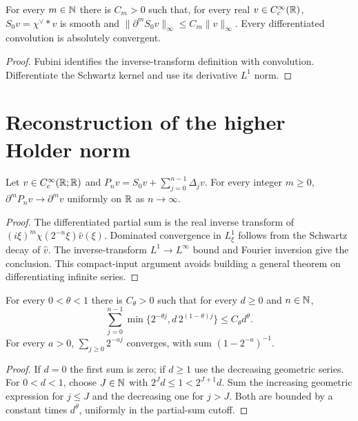 \begin{lemma}
  \label{lem:c12_low_block_bound}
  For every $m\in\mathbb{N}$ there is $C_m>0$ such that, for every real
  $v\in C_c^\infty(\mathbb{R})$, $S_0v=\chi^\vee*v$ is smooth and
  $\|\partial^mS_0v\|_\infty\le C_m\|v\|_\infty$.
  Every differentiated convolution is absolutely convergent.
\end{lemma}
\begin{proof}
  Fubini identifies the inverse-transform definition with convolution.
  Differentiate the Schwartz kernel and use its derivative $L^1$ norm.
\end{proof}

\section{Reconstruction of the higher Holder norm}

\begin{lemma}
  \label{lem:c12_reconstruction_derivatives}
  Let $v\in C_c^\infty(\mathbb{R};\mathbb{R})$ and
  $P_nv=S_0v+\sum_{j=0}^{n-1}\Delta_jv$.
  For every integer $m\ge0$, $\partial^mP_nv\to\partial^mv$ uniformly on $\mathbb{R}$ as $n\to\infty$.
\end{lemma}
\begin{proof}
  The differentiated partial sum is the real inverse transform of
  $(i\xi)^m\chi(2^{-n}\xi)\widehat v(\xi)$.
  Dominated convergence in $L^1_\xi$ follows from the Schwartz decay of $\widehat v$.
  The inverse-transform $L^1\to L^\infty$ bound and Fourier inversion give the conclusion.
  This compact-input argument avoids building a general theorem on differentiating infinite series.
\end{proof}

\begin{lemma}
  \label{lem:c12_dyadic_increment_sum}
  For every $0<\theta<1$ there is $C_\theta>0$ such that for every $d\ge0$ and $n\in\mathbb{N}$,
  \[
    \sum_{j=0}^{n-1}\min\{2^{-\theta j},d\,2^{(1-\theta)j}\}
        \le C_\theta d^\theta.
  \]
  For every $a>0$, $\sum_{j\ge0}2^{-aj}$ converges, with sum $(1-2^{-a})^{-1}$.
\end{lemma}
\begin{proof}
  If $d=0$ the first sum is zero; if $d\ge1$ use the decreasing geometric series.
  For $0<d<1$, choose $J\in\mathbb{N}$ with $2^Jd\le1<2^{J+1}d$.
  Sum the increasing geometric expression for $j\le J$ and the decreasing one for $j>J$.
  Both are bounded by a constant times $d^\theta$, uniformly in the partial-sum cutoff.
\end{proof}

